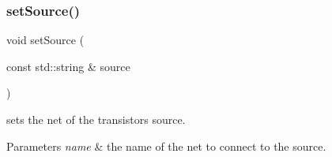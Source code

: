 \subsubsection{\texorpdfstring{set\+Source()}{setSource()}}
{\footnotesize\ttfamily void set\+Source (\begin{DoxyParamCaption}\item[{const std\+::string \&}]{source }\end{DoxyParamCaption})}



sets the net of the transistor\textquotesingle{}s source. 


\begin{DoxyParams}{Parameters}
{\em name} & the name of the net to connect to the source. \\
\hline
\end{DoxyParams}
